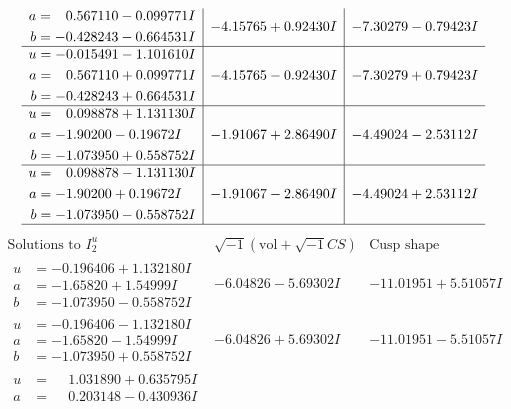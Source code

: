 \documentclass[1p]{elsarticle_modified}
\theoremstyle{definition}
\newcommand{\I}{\sqrt{-1}}
\begin{document}
$$\begin{array}{c|c|c}
\begin{aligned}
a &= \phantom{-}0.567110 - 0.099771 I \\
b &= -0.428243 - 0.664531 I\end{aligned}
 & -4.15765 + 0.92430 I & -7.30279 - 0.79423 I \\ \hline\begin{aligned}
u &= -0.015491 - 1.101610 I \\
a &= \phantom{-}0.567110 + 0.099771 I \\
b &= -0.428243 + 0.664531 I\end{aligned}
 & -4.15765 - 0.92430 I & -7.30279 + 0.79423 I \\ \hline\begin{aligned}
u &= \phantom{-}0.098878 + 1.131130 I \\
a &= -1.90200 - 0.19672 I \\
b &= -1.073950 + 0.558752 I\end{aligned}
 & -1.91067 + 2.86490 I & -4.49024 - 2.53112 I \\ \hline\begin{aligned}
u &= \phantom{-}0.098878 - 1.131130 I \\
a &= -1.90200 + 0.19672 I \\
b &= -1.073950 - 0.558752 I\end{aligned}
 & -1.91067 - 2.86490 I & -4.49024 + 2.53112 I\\
 \hline 
 \end{array}$$\newpage$$\begin{array}{c|c|c}  
\text{Solutions to }I^u_{2}& \I (\text{vol} + \sqrt{-1}CS) & \text{Cusp shape}\\
 \hline 
\begin{aligned}
u &= -0.196406 + 1.132180 I \\
a &= -1.65820 + 1.54999 I \\
b &= -1.073950 - 0.558752 I\end{aligned}
 & -6.04826 - 5.69302 I & -11.01951 + 5.51057 I \\ \hline\begin{aligned}
u &= -0.196406 - 1.132180 I \\
a &= -1.65820 - 1.54999 I \\
b &= -1.073950 + 0.558752 I\end{aligned}
 & -6.04826 + 5.69302 I & -11.01951 - 5.51057 I \\ \hline\begin{aligned}
u &= \phantom{-}1.031890 + 0.635795 I \\
a &= \phantom{-}0.203148 - 0.430936 I \\

\end{aligned}
\end{array}$$
\end{document}
